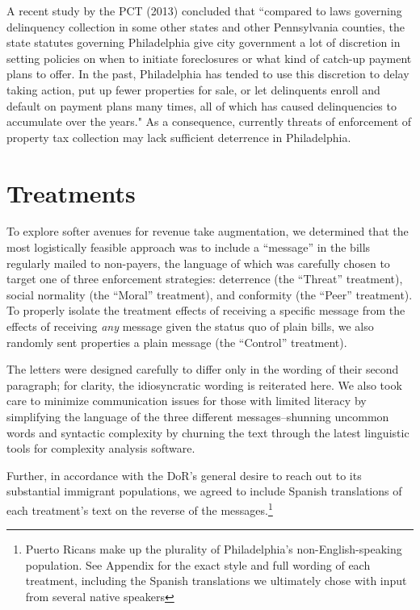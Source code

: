 \documentclass[12pt,titlepage]{article}
\begin{document}
A recent study by the PCT (2013) concluded that ``compared to laws
governing delinquency collection in some other states and other
Pennsylvania counties, the state statutes governing Philadelphia give
city government a lot of discretion in setting policies on when to
initiate foreclosures or what kind of catch-up payment plans to
offer. In the past, Philadelphia has tended to use this discretion to
delay taking action, put up fewer properties for sale, or let
delinquents enroll and default on payment plans many times, all of
which has caused delinquencies to accumulate over the years." As a
consequence, currently threats of enforcement of property tax collection may
lack sufficient deterrence in Philadelphia.

\section{Treatments}

To explore softer avenues for revenue take augmentation, we determined
that the most logistically feasible approach was to include a
``message'' in the bills regularly mailed to non-payers, the language
of which was carefully chosen to target one of three enforcement
strategies: deterrence (the ``Threat'' treatment), social normality
(the ``Moral'' treatment), and conformity (the ``Peer'' treatment). To
properly isolate the treatment effects of receiving a specific message
from the effects of receiving \textit{any} message given the status
quo of plain bills, we also randomly sent properties a plain message
(the ``Control'' treatment).

The letters were designed carefully to differ only in the wording of
their second paragraph; for clarity, the idiosyncratic wording is
reiterated here. We also took care to minimize communication issues for 
those with limited literacy by simplifying the language of the three different messages--shunning
uncommon words and syntactic complexity by churning the text
through the latest linguistic tools for complexity analysis software.  

Further, in accordance with the DoR's general desire to reach out to
its substantial immigrant populations, we agreed to include Spanish 
translations of each treatment's text on the reverse of the messages.\footnote{Puerto Ricans make up the plurality of
Philadelphia's non-English-speaking population.  See Appendix
  for the exact style and full wording of each treatment, including
  the Spanish translations we ultimately chose with input from several
  native speakers}
\end{document}
